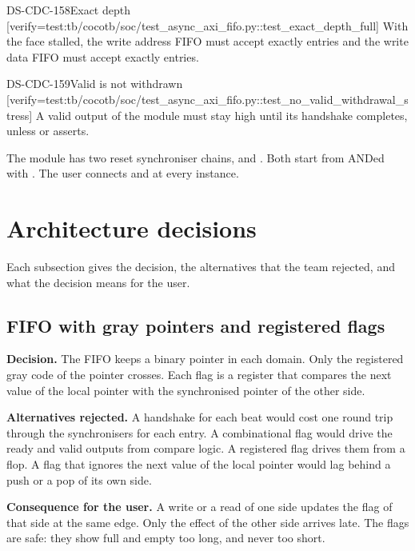 \begin{requirement}{DS-CDC-158}{Exact depth}
[verify={test:tb/cocotb/soc/test_async_axi_fifo.py::test_exact_depth_full}]
With the  face stalled, the write address FIFO must accept exactly  entries and the write data FIFO must accept exactly  entries.
\end{requirement}

\begin{requirement}{DS-CDC-159}{Valid is not withdrawn}
[verify={test:tb/cocotb/soc/test_async_axi_fifo.py::test_no_valid_withdrawal_stress}]
A valid output of the module must stay high until its handshake completes, unless  or  asserts.
\end{requirement}

\begin{information}
The module has two reset synchroniser chains,  and . Both start from  ANDed with . The user connects  and  at every instance.
\end{information}

\section{Architecture decisions}\label{ds:ch:mod-cdc-primitives:decisions}
Each subsection gives the decision, the alternatives that the team rejected, and what the decision means for the user.

\subsection{FIFO with gray pointers and registered flags}\label{ds:ch:mod-cdc-primitives:dec-fifo}
\textbf{Decision.} The FIFO keeps a binary pointer in each domain. Only the registered gray code of the pointer crosses. Each flag is a register that compares the next value of the local pointer with the synchronised pointer of the other side.

\textbf{Alternatives rejected.} A handshake for each beat would cost one round trip through the synchronisers for each entry. A combinational flag would drive the ready and valid outputs from compare logic. A registered flag drives them from a flop. A flag that ignores the next value of the local pointer would lag behind a push or a pop of its own side.

\textbf{Consequence for the user.} A write or a read of one side updates the flag of that side at the same edge. Only the effect of the other side arrives late. The flags are safe: they show full and empty too long, and never too short.

